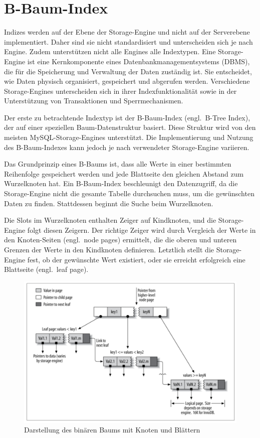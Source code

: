 \section{B-Baum-Index}\label{sec:indexing-b-baum-index}

Indizes werden auf der Ebene der Storage-Engine und nicht auf der Serverebene implementiert.
Daher sind sie nicht standardisiert und unterscheiden sich je nach Engine.
Zudem unterstützen nicht alle Engines alle Indextypen.
Eine Storage-Engine ist eine Kernkomponente eines Datenbankmanagementsystems (DBMS), die für die Speicherung und Verwaltung der Daten zuständig ist.
Sie entscheidet, wie Daten physisch organisiert, gespeichert und abgerufen werden.
Verschiedene Storage-Engines unterscheiden sich in ihrer Indexfunktionalität sowie in der Unterstützung von Transaktionen und Sperrmechanismen.

Der erste zu betrachtende Indextyp ist der B-Baum-Index (engl.\ B-Tree Index), der auf einer speziellen Baum-Datenstruktur basiert.
Diese Struktur wird von den meisten MySQL-Storage-Engines unterstützt.
Die Implementierung und Nutzung des B-Baum-Indexes kann jedoch je nach verwendeter Storage-Engine variieren.

Das Grundprinzip eines B-Baums ist, dass alle Werte in einer bestimmten Reihenfolge gespeichert werden und jede Blattseite den gleichen Abstand zum Wurzelknoten hat.
Ein B-Baum-Index beschleunigt den Datenzugriff, da die Storage-Engine nicht die gesamte Tabelle durchsuchen muss, um die gewünschten Daten zu finden.
Stattdessen beginnt die Suche beim Wurzelknoten.

Die Slots im Wurzelknoten enthalten Zeiger auf Kindknoten, und die Storage-Engine folgt diesen Zeigern.
Der richtige Zeiger wird durch Vergleich der Werte in den Knoten-Seiten (engl.\ node pages) ermittelt, die die oberen und unteren Grenzen der Werte in den Kindknoten definieren.
Letztlich stellt die Storage-Engine fest, ob der gewünschte Wert existiert, oder sie erreicht erfolgreich eine Blattseite (engl.\ leaf page).

\begin{figure}[!ht]
    \centering
    \includegraphics[width=.8\textwidth]{PNGs/Textbook/B_Tree_Visualisation}
    \caption[Binärbaum - Grafik]{Darstellung des binären Baums mit Knoten und Blättern}
    \label{fig:b-tree-visualisation}
\end{figure}

